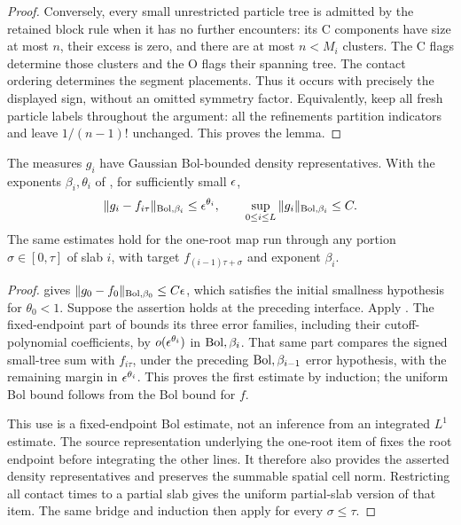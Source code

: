 \begin{proof}
Conversely, every small unrestricted particle tree is admitted by the
retained block rule when it has no further encounters: its C components
have size at most $n$, their excess is zero, and there are at most
$n<M_i$ clusters.  The C flags determine those clusters and the O flags
their spanning tree.  The contact ordering determines the segment
placements.  Thus it occurs with precisely the displayed sign, without
an omitted symmetry factor.  Equivalently, keep all fresh particle
labels throughout the argument: all the refinements partition indicators
and leave $1/(n-1)!$ unchanged.  This proves the lemma.
\end{proof}

\begin{proposition}\label{prop:one-root}
The measures $g_i$ have Gaussian Bol-bounded density representatives.
With the exponents $\beta_i,\theta_i$ of
, for sufficiently small $\epsilon$,
\begin{equation}\label{eq:one-root-convergence}
 \|g_i-f_{i\tau}\|_{\mathrm{Bol},\beta_i}\le\epsilon^{\theta_i},\qquad
 \sup_{0\le i\le L}\|g_i\|_{\mathrm{Bol},\beta_i}\le C.
\end{equation}
The same estimates hold for the one-root map run through any portion
$\sigma\in[0,\tau]$ of slab $i$, with target
$f_{(i-1)\tau+\sigma}$ and exponent $\beta_i$.
\end{proposition}

\begin{proof}
 gives
$\|g_0-f_0\|_{\mathrm{Bol},\beta_0}\le C\epsilon$, which satisfies the initial
smallness hypothesis for $\theta_0<1$.  Suppose the assertion holds at
the preceding interface.  Apply .  The
fixed-endpoint part of  bounds its three error
families, including their cutoff-polynomial coefficients, by
$o(\epsilon^{\theta_i})$ in $\mathrm{Bol},\beta_i$.  That same part compares the
signed small-tree sum with $f_{i\tau}$, under the preceding
$\mathrm{Bol},\beta_{i-1}$ error hypothesis, with the remaining margin in
$\epsilon^{\theta_i}$.  This proves the first estimate by induction; the
uniform Bol bound follows from the Bol bound for $f$.

This use is a fixed-endpoint Bol estimate, not an inference from an
integrated $L^1$ estimate.  The source representation underlying the
one-root item of  fixes the root endpoint before
integrating the other lines.  It therefore also provides the asserted
density representatives and preserves the summable spatial cell norm.
Restricting all contact times to a partial slab gives the uniform
partial-slab version of that item.  The same bridge and induction then
apply for every $\sigma\le\tau$.
\end{proof}

